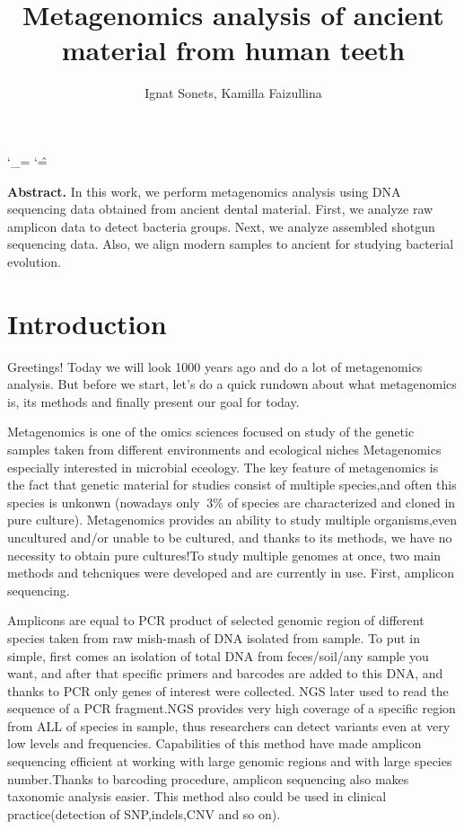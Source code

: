 \documentclass{article}
\title{  Metagenomics analysis of ancient material from human teeth }
\author{ Ignat Sonets, Kamilla Faizullina}
\date{\empty}
\begin{document}
	
		\catcode`\_=\active
	\catcode`\^=\active
	
\maketitle
 
\textbf{Abstract.}  In this work, we perform  metagenomics analysis using DNA sequencing data obtained from ancient dental material. First, we analyze raw amplicon data to detect bacteria groups. Next, we analyze assembled shotgun sequencing data. Also, we align modern samples to ancient for studying bacterial evolution.
 
\section{Introduction}
 Greetings! Today we will look 1000 years ago and do a lot of metagenomics analysis. But before we start, let's  do a quick rundown about what metagenomics is, its methods and finally present our goal for today.
 
Metagenomics is one of the omics sciences focused on study of the genetic samples taken from different environments and ecological niches Metagenomics especially interested in microbial eceology. The key feature of metagenomics is the fact that genetic material for studies consist of multiple species,and often this species is unkonwn (nowadays only $~3 \% $ of species are characterized and cloned in pure culture). Metagenomics provides an ability to study multiple organisms,even uncultured and/or unable to be cultured, and thanks to its methods, we have no necessity to obtain pure cultures!To study multiple genomes at once, two main methods and tehcniques were developed and are currently in use. First, amplicon sequencing.


Amplicons  are equal to PCR product of selected genomic region of different species taken from raw mish-mash of DNA isolated from sample. To put in simple, first comes an isolation of total DNA from feces/soil/any sample you want, and after that specific primers and barcodes are added to this DNA, and thanks to PCR only genes of interest were collected. NGS later used to read the sequence of a PCR fragment.NGS provides very high coverage of a specific region from ALL of species in sample, thus researchers can detect variants even  at very low levels and frequencies. Capabilities of this method have made amplicon sequencing efficient at working with large genomic regions and with large species number.Thanks to barcoding procedure, amplicon sequencing also makes taxonomic analysis easier. This method also could be used in clinical practice(detection of SNP,indels,CNV and so on). 
\end{document}
